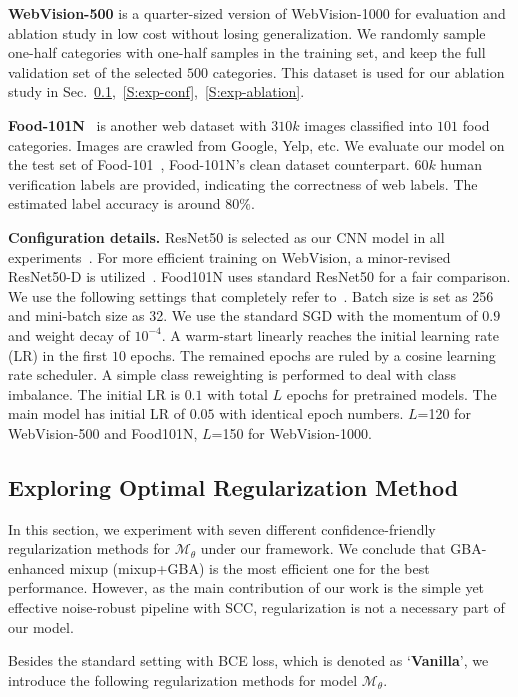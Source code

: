 \documentclass[runningheads]{llncs}
\begin{document}
\textbf{WebVision-500} is a quarter-sized version of WebVision-1000 for evaluation and ablation study in low cost without losing generalization. We randomly sample one-half categories with one-half samples in the training set, and keep the full validation set of the selected $500$ categories. This dataset is used for our ablation study in Sec.~\ref{S:exp-regular},~\ref{S:exp-conf},~\ref{S:exp-ablation}. 

\textbf{Food-101N}~\cite{lee2018cleannet} is another web dataset with $310k$ images classified into $101$ food categories. Images are crawled from Google, Yelp, etc. We evaluate our model on the test set of Food-101~\cite{bossard2014food}, Food-101N's clean dataset counterpart. $60k$ human verification labels are provided, indicating the correctness of web labels. The estimated label accuracy is around $80\%$.

\textbf{Configuration details.}
ResNet50 is selected as our CNN model in all experiments~\cite{he2016deep}. 
For more efficient training on WebVision, a minor-revised ResNet50-D is utilized~\cite{he2019bag}. Food101N uses standard ResNet50 for a fair comparison.
We use the following settings that completely refer to~\cite{he2019bag}.
Batch size is set as 256 and mini-batch size as 32. We use the standard SGD with the momentum of $0.9$ and weight decay of $10^{-4}$. A warm-start linearly reaches the initial learning rate (LR) in the first $10$ epochs. The remained epochs are ruled by a cosine learning rate scheduler. A simple class reweighting is performed to deal with class imbalance. The initial LR is $0.1$ with total $L$ epochs for pretrained models. The main model has initial LR of $0.05$ with identical epoch numbers. $L$=120 for WebVision-500 and Food101N, $L$=150 for WebVision-1000.
	
\subsection{Exploring Optimal Regularization Method}
\label{S:exp-regular}
In this section, we experiment with seven different confidence-friendly regularization methods for $\mathcal{M}_\theta$ under our framework. We conclude that GBA-enhanced mixup (mixup+GBA) is the most efficient one for the best performance. However, as the main contribution of our work is the simple yet effective noise-robust pipeline with SCC, regularization is not a necessary part of our model.



Besides the standard setting with BCE loss, which is denoted as `\textbf{Vanilla}', we introduce the following  regularization methods for model $\mathcal{M}_\theta$.
\end{document}
